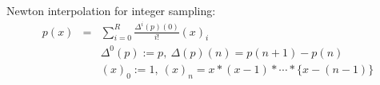 \documentclass[10pt]{article}
\begin{document}
Newton interpolation for integer sampling:
\begin{eqnarray} \nonumber
p(x) &=& \sum_{i=0}^{R} \frac{\Delta^i(p)(0)}{i!} \left(x \right)_i\\
\nonumber
&&\Delta^0(p) := p,~ \Delta(p)(n) = p(n+1) - p(n)\\
\nonumber
&& \left(x \right)_0 := 1,~ \left(x \right)_n = x*(x-1)* \cdots * \{x - (n-1)\}
\end{eqnarray}
\end{document}
